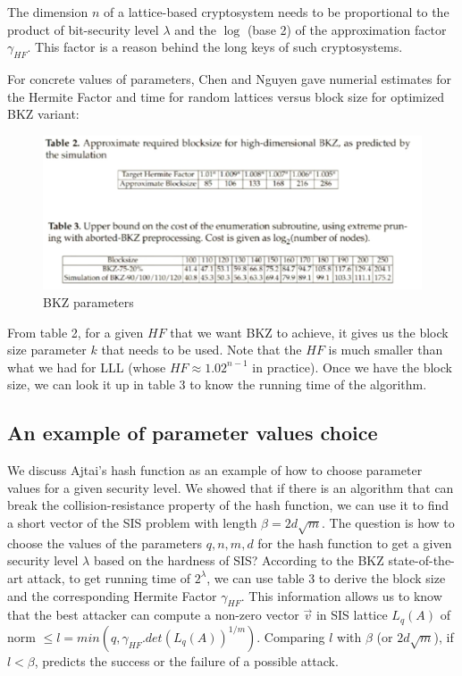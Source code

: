 \begin{remark}
  The dimension $n$ of a lattice-based cryptosystem needs to be proportional to
  the product of bit-security level $\lambda$ and the $\log$ (base 2) of the
  approximation factor $\gamma_{HF}$.  This factor is a reason behind the long
  keys of such cryptosystems.
  \label{rem:dimension}
\end{remark}

For concrete values of parameters, Chen and Nguyen \cite{chen2011bkz} gave
numerial estimates for the Hermite Factor and time for random lattices versus block
size for optimized BKZ variant:

\begin{figure}[h]
  \centering \includegraphics[scale=0.3]{bkzparams}
  \caption{BKZ parameters}
  \label{fig:BKZParams}
\end{figure}

From table 2, for a given $HF$ that we want BKZ to achieve, it gives us the
block size parameter $k$ that needs to be used. Note that the $HF$ is much
smaller than what we had for LLL (whose $HF \approx 1.02^{n-1}$ in
practice). Once we have the block size, we can look it up in table 3 to know the
running time of the algorithm.

\subsection{An example of parameter values choice}
\label{sec:parameterChoice}
We discuss Ajtai's hash function as an example of how to choose parameter values for
a given security level. We showed that if there is an algorithm that can break the
collision-resistance property of the hash function, we can use it to find a
short vector of the SIS problem with length $\beta = 2d\sqrt{m}$. The question
is how to choose the values of the parameters $q,n,m,d$ for the hash function to get a
given security level $\lambda$ based on the hardness of SIS? According to the
BKZ state-of-the-art attack, to get running time of $2^\lambda$, we can use
table 3 to derive the block size and the corresponding Hermite Factor $\gamma_{HF}$.
This information allows us to know that the best attacker can compute a non-zero vector $\vec{v}$ in SIS
lattice $L_q(A)$ of norm $\leq l = min(q, \gamma_{HF}.det(L_q(A))^{1/m})$. 
Comparing $l$ with $\beta$ (or $2d\sqrt{m}$), if $l < \beta$, predicts the success or the failure of a possible attack.

